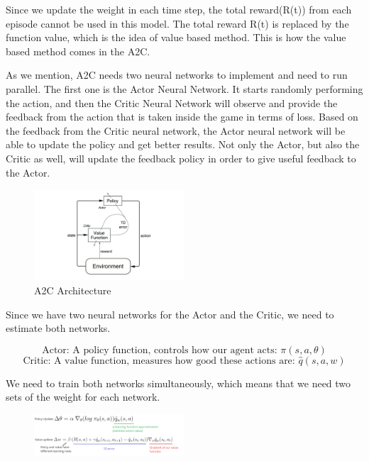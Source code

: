 \documentclass{article}
\begin{document}
Since we update the weight in each time step, the total reward(R(t)) from each episode cannot be used in this model. The total reward R(t) is replaced by the function value, which is the idea of value based method. This is how the value based method comes in the A2C. \par 

As we mention, A2C needs two neural networks to implement and need to run parallel. The first one is the Actor Neural Network. It starts randomly performing the action, and then the Critic Neural Network will observe and provide the feedback from the action that is taken inside the game in terms of loss. Based on the feedback from the Critic neural network, the Actor neural network will be able to update the policy and get better results. Not only the Actor, but also the Critic as well, will update the feedback policy in order to give useful feedback to the Actor. \par

\begin{figure}[H]
    \caption{A2C Architecture}
    \centering
    \includegraphics[width=0.5\textwidth]{A2C_Arch.png}
\end{figure}

Since we have two neural networks for the Actor and the Critic,  we need to estimate both networks. \par 

$$\text{Actor: A policy function, controls how our agent acts: } \pi(s, a, \theta)$$
$$\text{Critic: A value function, measures how good these actions are: } \hat{q}(s, a, w)$$

We need to train both networks simultaneously, which means that we need two sets of the weight for each network. \par

\begin{figure}[H]
    \centering
    \includegraphics[width=0.5\textwidth]{A2C_eq.png}
\end{figure}
\end{document}
